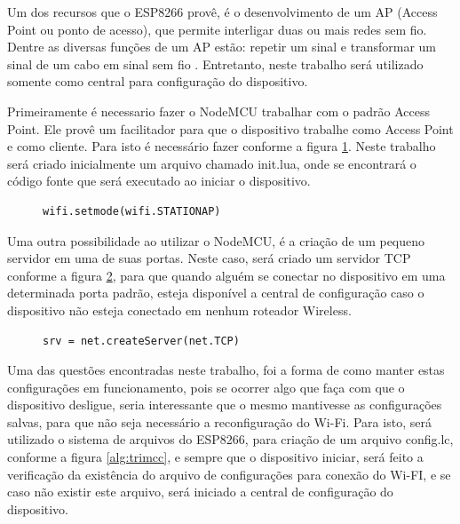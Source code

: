 \documentclass[journal]{IEEEtran}
\begin{document}
Um dos recursos que o ESP8266 provê, é o desenvolvimento de um AP (Access Point ou ponto de acesso), que permite interligar duas ou mais redes sem fio. Dentre as diversas funções de um AP estão: repetir um sinal e transformar um sinal de um cabo em sinal sem fio \cite{accesspoint}. Entretanto, neste trabalho será utilizado somente como central para configuração do dispositivo.

Primeiramente é necessario fazer o NodeMCU trabalhar com o padrão Access Point. Ele provê um facilitador para que o dispositivo trabalhe como Access Point e como cliente. Para isto é necessário fazer conforme a figura \ref{alg:STATIONAP}. Neste trabalho será criado inicialmente um arquivo chamado init.lua, onde se encontrará o código fonte que será executado ao iniciar o dispositivo.


\begin{figure}[h]
\centering

\begin{verbatim}
wifi.setmode(wifi.STATIONAP)
\end{verbatim}

\label{alg:STATIONAP}
\end{figure}

Uma outra possibilidade ao utilizar o NodeMCU, é a criação de um pequeno servidor em uma de suas portas. Neste caso, será criado um servidor TCP conforme a figura \ref{alg:TCPSERVER}, para que quando alguém se conectar no dispositivo em uma determinada porta padrão, esteja disponível a central de configuração caso o dispositivo não esteja conectado em nenhum roteador Wireless.

\begin{figure}[h]
\centering

\begin{verbatim}
srv = net.createServer(net.TCP)
\end{verbatim}

\label{alg:TCPSERVER}
\end{figure}

Uma das questões encontradas neste trabalho, foi a forma de como manter estas configurações em funcionamento, pois se ocorrer algo que faça com que o dispositivo desligue, seria interessante que o mesmo mantivesse as configurações salvas, para que não seja necessário a reconfiguração do Wi-Fi. Para isto, será utilizado o sistema de arquivos do ESP8266, para criação de um arquivo config.lc, conforme a figura \ref{alg:trimcc}, e sempre que o dispositivo iniciar, será feito a verificação da existência do arquivo de configurações para conexão do Wi-FI, e se caso não existir este arquivo, será iniciado a central de configuração do dispositivo.
\end{document}
